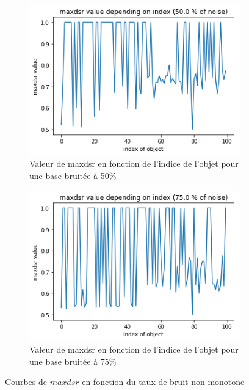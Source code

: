 \documentclass[a4paper]{article}
\begin{document}
\begin{figure}[H]
    \begin{subfigure}[c]{0.46\textwidth}
	    \centering 
	    \includegraphics[width=\textwidth]{images/maxdsr_50.png}
        \caption{Valeur de maxdsr en fonction de l'indice de l'objet pour une base
        bruitée à 50\%}
        \label{img:maxdsr50}
    \end{subfigure}
    \begin{subfigure}[c]{0.46\textwidth}
    	\centering
    	\includegraphics[width=\textwidth]{images/maxdsr_75.png}
        \caption{Valeur de maxdsr en fonction de l'indice de l'objet pour une base
        bruitée à 75\%}
        \label{img:maxdsr75}
    \end{subfigure}
\caption{Courbes de $maxdsr$ en fonction du taux de bruit non-monotone}
\end{figure}
\end{document}

